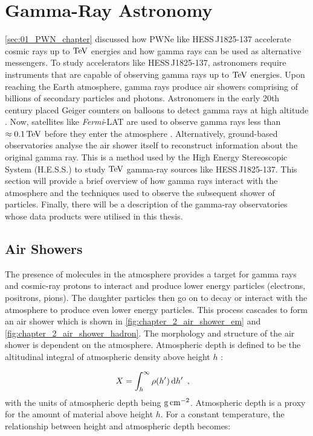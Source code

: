 \chapter{Gamma-Ray Astronomy} \label{sec:02_astronomy}

\autoref{sec:01_PWN_chapter} discussed how PWNe like \mbox{HESS\,J1825-137} accelerate cosmic rays up to $\TeV$ energies and how gamma rays can be used as alternative messengers. To study accelerators like \mbox{HESS\,J1825-137}, astronomers require instruments that are capable of observing gamma rays up to $\TeV$ energies.
\newpar 
Upon reaching the Earth atmosphere, gamma rays produce air showers comprising of billions of secondary particles and photons. Astronomers in the early 20th century placed Geiger counters on balloons to detect gamma rays at high altitude \citep{hess1912observations}. Now, satellites like \textit{Fermi}-LAT are used to observe gamma rays less than $\approx 0.1\,\TeV$ before they enter the atmosphere \citep{2010RPPh...73g4901M}. Alternatively, ground-based observatories analyse the air shower itself to reconstruct information about the original gamma ray. This is a method used by the High Energy Stereoscopic System (H.E.S.S.) to study $\TeV$ gamma-ray sources like \mbox{HESS\,J1825-137}.
\newpar 
This section will provide a brief overview of how gamma rays interact with the atmosphere and the techniques used to observe the subsequent shower of particles. Finally, there will be a description of the gamma-ray observatories whose data products were utilised in this thesis.%

\section{Air Showers}

The presence of molecules in the atmosphere provides a target for gamma rays and cosmic-ray protons to interact and produce lower energy particles (electrons, positrons, pions). The daughter particles then go on to decay or interact with the atmosphere to produce even lower energy particles. This process cascades to form an air shower which is shown in \autoref{fig:chapter_2_air_shower_em} and \autoref{fig:chapter_2_air_shower_hadron}.
\newpar 
The morphology and structure of the air shower is dependent on the atmosphere. Atmospheric depth is defined to be the altitudinal integral of atmospheric density above height $h$ \citep{alma9924446790001811}:

\begin{equation}
    \begin{aligned}
    X&=\int_{h}^\infty \rho\qty(h')\dd{h'}\text{ ,}
    \end{aligned}
\end{equation}
\noindent with the units of atmospheric depth being $\si{\gram\per\centi\meter\squared}$. Atmospheric depth is a proxy for the amount of material above height $h$. For a constant temperature, the relationship between height and atmospheric depth becomes:

